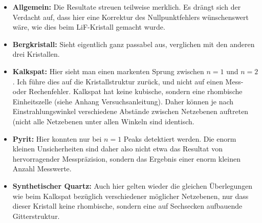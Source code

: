 \begin{itemize}
	\item
        \textbf{Allgemein:} Die   Resultate  streuen   teilweise  merklich. Es
        dr\"angt  sich  der  Verdacht  auf,   dass  hier  eine  Korrektur  des
        Nullpunktfehlers w\"unschenswert w\"are, wie dies beim LiF-Kristall
		gemacht wurde.
	\item
        \textbf{Bergkristall:} Sieht eigentlich ganz  passabel aus, verglichen
        mit den anderen drei Kristallen.
	\item
        \textbf{Kalkspat:} Hier  sieht  man  einen markenten  Sprung  zwischen
        $n  = 1$  und  $n  = 2$. Ich  f\"uhre  dies  auf die  Kristallstruktur
        zur\"uck,  und  nicht  auf  einen  Mess-  oder  Rechenfehler. Kalkspat
        hat  keine  kubische,  sondern eine  rhombische  Einheitszelle  (siehe
        Anhang Versuchsanleitung). Daher k\"onnen  je nach Einstrahlungswinkel
        verschiedene  Abst\"ande  zwischen  Netzebenen auftreten  (nicht  alle
        Netzebenen unter allen Winkeln sind identisch.
	\item
        \textbf{Pyrit:} Hier  konnten  nur  bei   $n  =  1$  Peaks  detektiert
        werden. Die enorm  kleinen Unsicherheiten  sind daher also  nicht etwa
        das Resultat von hervorragender  Messpr\"azision, sondern das Ergebnis
        einer enorm kleinen Anzahl Messwerte.
	\item
        \textbf{Synthetischer  Quartz:} Auch hier  gelten wieder  die gleichen
        \"Uberlegungen wie beim Kalkspat bez\"uglich verschiedener m\"oglicher
        Netzebenen, nur  dass dieser  Kristall keine rhombische,  sondern eine
        auf Sechsecken aufbauende Gitterstruktur.
\end{itemize}
